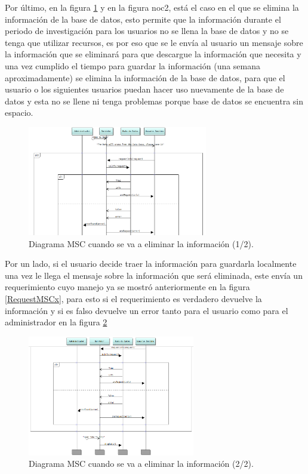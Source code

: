 Por último, en la figura \ref{DropInfoMSC1} y en la figura noc2, está el caso en el que se elimina la información de la base de datos, esto permite que la información durante el periodo de investigación para los usuarios no se llena la base de datos y no se tenga que utilizar recursos, es por eso que se le envía al usuario un mensaje sobre la información que se eliminará para que descargue la información que necesita y una vez cumplido el tiempo para guardar la información (una semana aproximadamente) se elimina la información de la base de datos, para que el usuario o los siguientes usuarios puedan hacer uso nuevamente de la base de datos y esta no se llene ni tenga problemas porque base de datos se encuentra sin espacio.

\begin{figure}[h]
    \centering
    \includegraphics[width=0.7\textwidth]{images/DropInfo_MSC1x.png}
    \caption{Diagrama MSC cuando se va a eliminar la información (1/2).}
    \label{DropInfoMSC1}
\end{figure}

\pagebreak

Por un lado, si el usuario decide traer la información para guardarla localmente una vez le llega el mensaje sobre la información que será eliminada, este envía un requerimiento cuyo manejo ya se mostró anteriormente en la figura \ref{RequestMSCx}, para esto si el requerimiento es verdadero devuelve la información y si es falso devuelve un error tanto para el usuario como para el administrador en la figura \ref{DropInfoMSC2}

\begin{figure}[h]
    \centering
    \includegraphics[width=0.65\textwidth]{images/DropInfo_MSC2x.png}
    \caption{Diagrama MSC cuando se va a eliminar la información (2/2).}
    \label{DropInfoMSC2}
\end{figure}

